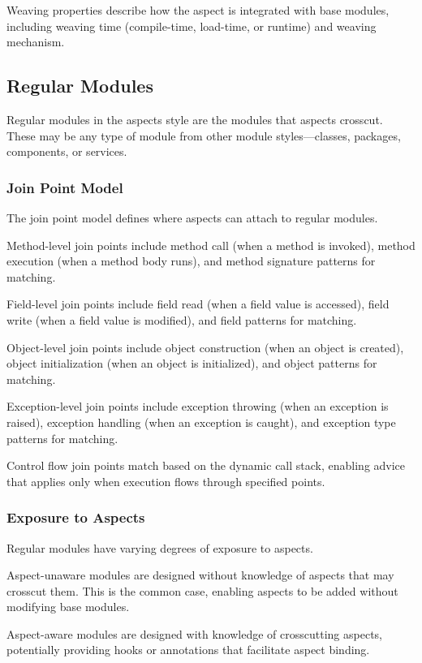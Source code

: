 \documentclass[11pt]{article}
\begin{document}
Weaving properties describe how the aspect is integrated with base modules, including weaving time (compile-time, load-time, or runtime) and weaving mechanism.

\subsection{Regular Modules}

Regular modules in the aspects style are the modules that aspects crosscut. These may be any type of module from other module styles---classes, packages, components, or services.

\subsubsection{Join Point Model}

The join point model defines where aspects can attach to regular modules.

Method-level join points include method call (when a method is invoked), method execution (when a method body runs), and method signature patterns for matching.

Field-level join points include field read (when a field value is accessed), field write (when a field value is modified), and field patterns for matching.

Object-level join points include object construction (when an object is created), object initialization (when an object is initialized), and object patterns for matching.

Exception-level join points include exception throwing (when an exception is raised), exception handling (when an exception is caught), and exception type patterns for matching.

Control flow join points match based on the dynamic call stack, enabling advice that applies only when execution flows through specified points.

\subsubsection{Exposure to Aspects}

Regular modules have varying degrees of exposure to aspects.

Aspect-unaware modules are designed without knowledge of aspects that may crosscut them. This is the common case, enabling aspects to be added without modifying base modules.

Aspect-aware modules are designed with knowledge of crosscutting aspects, potentially providing hooks or annotations that facilitate aspect binding.
\end{document}
